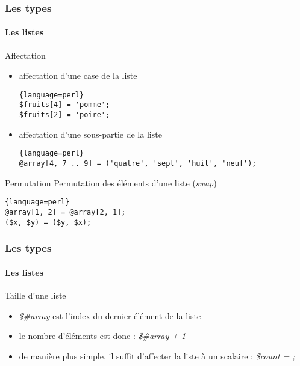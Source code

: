 \begin{frame}[fragile]
  \frametitle{Les types}
  \framesubtitle{Les listes}

  \begin{exampleblock}{Affectation}
    \begin{itemize}
    \item affectation d'une case de la liste
      \begin{lstlisting}{language=perl}
$fruits[4] = 'pomme';
$fruits[2] = 'poire';
      \end{lstlisting}
    \item affectation d'une sous-partie de la liste
      \begin{lstlisting}{language=perl}
@array[4, 7 .. 9] = ('quatre', 'sept', 'huit', 'neuf');
      \end{lstlisting}
    \end{itemize}
  \end{exampleblock}

  \begin{alertblock}{Permutation}
    Permutation des éléments d'une liste (\textit{swap})
    \begin{lstlisting}{language=perl}
@array[1, 2] = @array[2, 1];
($x, $y) = ($y, $x);
    \end{lstlisting}
  \end{alertblock}

\end{frame}

\begin{frame}[fragile]
  \frametitle{Les types}
  \framesubtitle{Les listes}

  \begin{block}{Taille d'une liste}
    \begin{itemize}
    \item \textit{\$\#array} est l'index du dernier élément de la liste
      \textit{\@array}
    \item le nombre d'éléments est donc : \textit{\$\#array + 1}
    \item de manière plus simple, il suffit d'affecter
      la liste à un scalaire : \textit{\$count = \@array;}
    \end{itemize}
  \end{block}

\end{frame}


